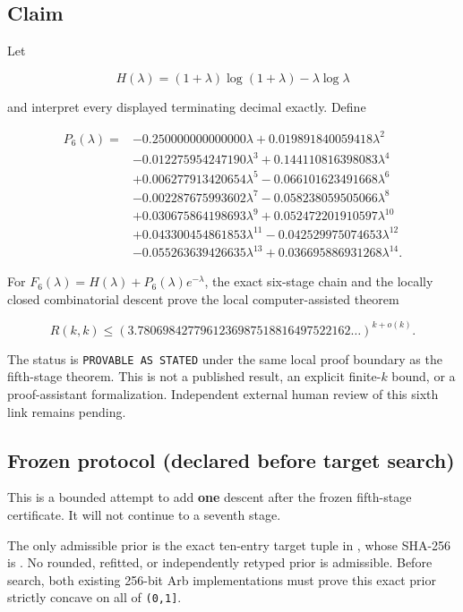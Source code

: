 \subsection{Claim}

Let

\[
H(\lambda)=(1+\lambda)\log(1+\lambda)-\lambda\log\lambda
\]

and interpret every displayed terminating decimal exactly. Define

\[
\begin{aligned}
P_6(\lambda)={}&-0.250000000000000\lambda
+0.019891840059418\lambda^2\\
&-0.012275954247190\lambda^3
+0.144110816398083\lambda^4\\
&+0.006277913420654\lambda^5
-0.066101623491668\lambda^6\\
&-0.002287675993602\lambda^7
-0.058238059505066\lambda^8\\
&+0.030675864198693\lambda^9
+0.052472201910597\lambda^{10}\\
&+0.043300454861853\lambda^{11}
-0.042529975074653\lambda^{12}\\
&-0.055263639426635\lambda^{13}
+0.036695886931268\lambda^{14}.
\end{aligned}
\]

For \(F_6(\lambda)=H(\lambda)+P_6(\lambda)e^{-\lambda}\), the exact
six-stage chain and the locally closed combinatorial descent prove the
local computer-assisted theorem

\[
\boxed{
R(k,k)\leq
\left(3.7806984277961236987518816497522162\ldots\right)^{k+o(k)}.
}
\]

The status is \texttt{PROVABLE\ AS\ STATED} under the same local proof
boundary as the fifth-stage theorem. This is not a published result, an
explicit finite-\(k\) bound, or a proof-assistant formalization.
Independent external human review of this sixth link remains pending.

\subsection{Frozen protocol (declared before target search)}

This is a bounded attempt to add \textbf{one} descent after the frozen
fifth-stage certificate. It will not continue to a seventh stage.

The only admissible prior is the exact ten-entry target tuple in
, whose SHA-256 is
.
No rounded, refitted, or independently retyped prior is admissible.
Before search, both existing 256-bit Arb implementations must prove this
exact prior strictly concave on all of \texttt{(0,1{]}}.

